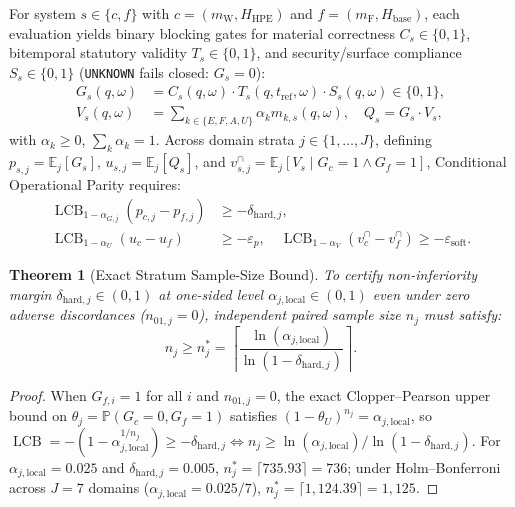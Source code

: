 \documentclass[10pt,twocolumn]{article}
\newtheorem{theorem}{Theorem}
\begin{document}
For system $s \in \{c, f\}$ with $c=(m_{\mathrm{W}}, H_{\mathrm{HPE}})$ and $f=(m_{\mathrm{F}}, H_{\mathrm{base}})$, each evaluation yields binary blocking gates for material correctness $C_s \in \{0,1\}$, bitemporal statutory validity $T_s \in \{0,1\}$, and security/surface compliance $S_s \in \{0,1\}$ (\texttt{UNKNOWN} fails closed: $G_s=0$):
\begin{align}
G_s(q,\omega) &= C_s(q,\omega)\cdot T_s(q,t_{\mathrm{ref}},\omega)\cdot S_s(q,\omega) \in \{0,1\}, \\
V_s(q,\omega) &= \sum_{k \in \{E,F,A,U\}} \alpha_k m_{k,s}(q,\omega), \quad Q_s = G_s \cdot V_s,
\end{align}
with $\alpha_k \ge 0$, $\sum_k \alpha_k = 1$. Across domain strata $j \in \{1,\dots,J\}$, defining $p_{s,j}=\mathbb{E}_j[G_s]$, $u_{s,j}=\mathbb{E}_j[Q_s]$, and $v_{s,j}^{\cap}=\mathbb{E}_j[V_s \mid G_c=1 \land G_f=1]$, Conditional Operational Parity requires:
\begin{equation}
\begin{aligned}
\operatorname{LCB}_{1-\alpha_{G,j}}(p_{c,j}-p_{f,j}) &\ge -\delta_{\mathrm{hard},j}, \\
\operatorname{LCB}_{1-\alpha_U}(u_c-u_f) &\ge -\varepsilon_p, \quad
\operatorname{LCB}_{1-\alpha_V}(v_c^{\cap}-v_f^{\cap}) \ge -\varepsilon_{\mathrm{soft}}.
\end{aligned}
\end{equation}

\begin{theorem}[Exact Stratum Sample-Size Bound]
To certify non-inferiority margin $\delta_{\mathrm{hard},j} \in (0,1)$ at one-sided level $\alpha_{j,\mathrm{local}} \in (0,1)$ even under zero adverse discordances ($n_{01,j}=0$), independent paired sample size $n_j$ must satisfy:
\begin{equation}
n_j \ge n_j^* = \left\lceil \frac{\ln(\alpha_{j,\mathrm{local}})}{\ln(1 - \delta_{\mathrm{hard},j})} \right\rceil.
\end{equation}
\end{theorem}
\begin{proof}
When $G_{f,i}=1$ for all $i$ and $n_{01,j}=0$, the exact Clopper--Pearson upper bound \cite{clopper1934use} on $\theta_j = \mathbb{P}(G_c=0,G_f=1)$ satisfies $(1-\theta_U)^{n_j}=\alpha_{j,\mathrm{local}}$, so $\operatorname{LCB} = -(1-\alpha_{j,\mathrm{local}}^{1/n_j}) \ge -\delta_{\mathrm{hard},j} \iff n_j \ge \ln(\alpha_{j,\mathrm{local}})/\ln(1-\delta_{\mathrm{hard},j})$. For $\alpha_{j,\mathrm{local}}=0.025$ and $\delta_{\mathrm{hard},j}=0.005$, $n_j^* = \lceil 735.93 \rceil = 736$; under Holm--Bonferroni \cite{holm1979simple} across $J=7$ domains ($\alpha_{j,\mathrm{local}}=0.025/7$), $n_j^* = \lceil 1{,}124.39 \rceil = 1{,}125$.
\end{proof}
\end{document}
